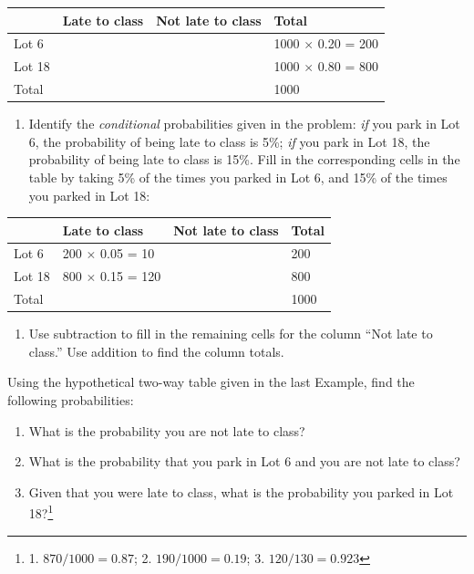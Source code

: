 \documentclass[
  10pt,
  openany]{book}
\providecommand{\tightlist}{%
  \setlength{\itemsep}{0pt}\setlength{\parskip}{0pt}}
\theoremstyle{definition}
\theoremstyle{definition}
\theoremstyle{definition}
\theoremstyle{definition}
\theoremstyle{remark}
\begin{document}
{\def\LTcaptype{none} %
\begin{longtable}[]{@{}llll@{}}
\toprule\noalign{}
& Late to class & Not late to class & Total \\
\midrule\noalign{}
\endhead
\bottomrule\noalign{}
\endlastfoot
Lot 6 & & & 1000 \(\times\) 0.20 = 200 \\
Lot 18 & & & 1000 \(\times\) 0.80 = 800 \\
Total & & & 1000 \\
\end{longtable}
}

\begin{enumerate}
\def\labelenumi{\arabic{enumi}.}
\setcounter{enumi}{1}
\tightlist
\item
  Identify the \emph{conditional} probabilities given in the problem: \emph{if} you park in Lot 6, the probability of being late to class is 5\%; \emph{if} you park in Lot 18, the probability of being late to class is 15\%. Fill in the corresponding cells in the table by taking 5\% of the times you parked in Lot 6, and 15\% of the times you parked in Lot 18:
\end{enumerate}

{\def\LTcaptype{none} %
\begin{longtable}[]{@{}llll@{}}
\toprule\noalign{}
& Late to class & Not late to class & Total \\
\midrule\noalign{}
\endhead
\bottomrule\noalign{}
\endlastfoot
Lot 6 & 200 \(\times\) 0.05 = 10 & & 200 \\
Lot 18 & 800 \(\times\) 0.15 = 120 & & 800 \\
Total & & & 1000 \\
\end{longtable}
}

\begin{enumerate}
\def\labelenumi{\arabic{enumi}.}
\setcounter{enumi}{2}
\tightlist
\item
  Use subtraction to fill in the remaining cells for the column ``Not late to class.'' Use addition to find the column totals.
\end{enumerate}

Using the hypothetical two-way table given in the last Example, find the following probabilities:

\begin{enumerate}
\def\labelenumi{\arabic{enumi}.}
\tightlist
\item
  What is the probability you are not late to class?
\item
  What is the probability that you park in Lot 6 and you are not late to class?
\item
  Given that you were late to class, what is the probability you parked in Lot 18?\footnote{1. \(870/1000 = 0.87\); 2. \(190/1000 = 0.19\); 3. \(120/130 = 0.923\)}
\end{enumerate}
\end{document}
